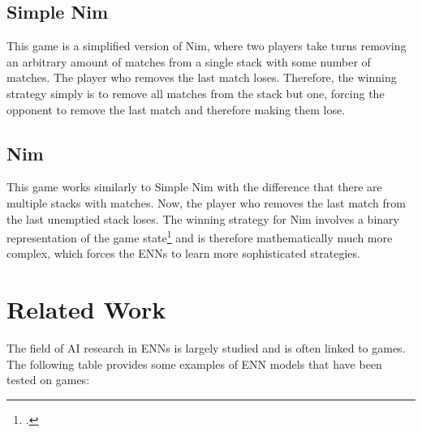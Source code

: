 \documentclass[11pt]{report}
\begin{document}
\begin{enumerate}
    \subsection{Simple Nim}\label{subsec:simple-nim}
    This game is a simplified version of Nim, where two players take turns removing an arbitrary amount of matches from a single stack with some number of matches.
    The player who removes the last match loses.
    Therefore, the winning strategy simply is to remove all matches from the stack but one, forcing the opponent to remove the last match and therefore making them lose.

    \subsection{Nim}\label{subsec:nim}
    This game works similarly to Simple Nim with the difference that there are multiple stacks with matches.
    Now, the player who removes the last match from the last unemptied stack loses.
    The winning strategy for Nim involves a binary representation of the game state\footcite{rosenbloom2003} and is therefore mathematically much more complex, which forces the ENNs to learn more sophisticated strategies.


    \section{Related Work}\label{sec:related-work}
    The field of AI research in ENNs is largely studied and is often linked to games.
    The following table provides some examples of ENN models that have been tested on games:


\end{enumerate}
\end{document}
